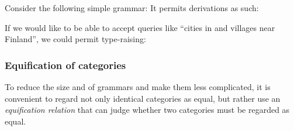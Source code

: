 \documentclass[main.tex]{subfiles}
\begin{document}
\begin{example}
    Consider the following simple grammar:
    It permits derivations as such:

    If we would like to be able to accept queries like ``cities in and villages
    near Finland'', we could permit type-raising:

\end{example}

\subsubsection{Equification of categories}
\label{hack:equification}
To reduce the size and of grammars and make them less complicated,
it is convenient to regard
not only identical categories as equal, but rather use an \emph{equification
relation} that can judge whether two categories must be regarded as equal.
\end{document}
